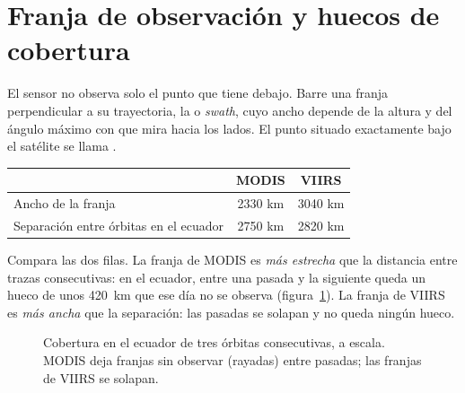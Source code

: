 \section{Franja de observación y huecos de cobertura}\label{sec:huecos}

El sensor no observa solo el punto que tiene debajo. Barre una franja perpendicular a su
trayectoria, la  o \emph{swath}, cuyo ancho depende de la altura y
del ángulo máximo con que mira hacia los lados. El punto situado exactamente bajo el satélite se
llama .

\begin{center}
\begin{tabular}{lcc}
\toprule
 & MODIS & VIIRS \\
\midrule
Ancho de la franja & 2330 km & 3040 km \\
Separación entre órbitas en el ecuador & 2750 km & 2820 km \\
\bottomrule
\end{tabular}
\end{center}

Compara las dos filas. La franja de MODIS es \emph{más estrecha} que la distancia entre trazas
consecutivas: en el ecuador, entre una pasada y la siguiente queda un hueco de unos 420~km que
ese día no se observa (figura~\ref{fig:huecos}). La franja de VIIRS es \emph{más ancha} que la
separación: las pasadas se solapan y no queda ningún hueco.

\begin{figure}[ht]
\centering
{}
\caption{Cobertura en el ecuador de tres órbitas consecutivas, a escala. MODIS deja franjas sin
observar (rayadas) entre pasadas; las franjas de VIIRS se solapan.}
\label{fig:huecos}
\end{figure}

